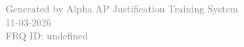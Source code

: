 \documentclass[11pt,letterpaper]{article}
\begin{document}
\vspace{0.5cm}



\vfill

\begin{center}
  \small
  \textcolor{gray}{Generated by Alpha AP Justification Training System} \\
  \textcolor{gray}{11-03-2026} \\
  \textcolor{gray}{FRQ ID: undefined}
\end{center}
\end{document}

